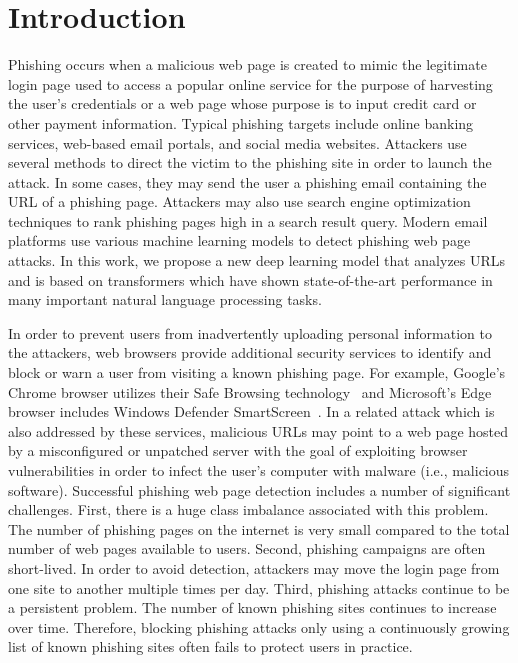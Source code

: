 \section{Introduction}
\label{sec:urltran:intro}
 Phishing occurs when a malicious web page is created to mimic the legitimate login page used to access a popular online service for the purpose of harvesting the user's credentials or a web page whose purpose is to input credit card or other payment information.
Typical phishing targets include online banking services, web-based email portals, and social media websites.
Attackers use several methods to direct the victim to the phishing site in order to launch the attack.
In some cases, they may send the user a phishing email containing the URL of a phishing page.
Attackers may also use search engine optimization techniques to rank phishing pages high in a search result query.
Modern email platforms use various machine learning models to detect phishing web page attacks.
In this work, we propose a new deep learning model that analyzes URLs and is based on transformers which have shown state-of-the-art performance in many important natural language processing tasks.


In order to prevent users from inadvertently uploading personal information to the attackers, web browsers provide additional security services to identify and block or warn a user from visiting a known phishing page.
For example, Google's Chrome browser utilizes their Safe Browsing technology~\citep{safebrowsing_google} and Microsoft's Edge browser includes Windows Defender SmartScreen~\citep{smartscreen_microsoft}.
In a related attack which is also addressed by these services, malicious URLs may point to a web page hosted by a misconfigured or unpatched server with the goal of exploiting browser vulnerabilities in order to infect the user's computer with malware (i.e., malicious software).
Successful phishing web page detection includes a number of significant challenges.
First, there is a huge class imbalance associated with this problem.
The number of phishing pages on the internet is very small compared to the total number of web pages available to users. Second, phishing campaigns are often short-lived. In order to avoid detection, attackers may move the login page from one site to another multiple times per day.
Third, phishing attacks continue to be a persistent problem.
The number of known phishing sites continues to increase over time. Therefore, blocking phishing attacks only using a continuously growing list of known phishing sites often fails to protect users in practice.



